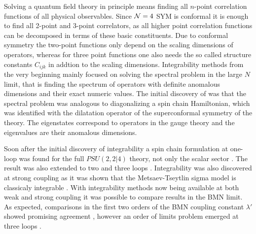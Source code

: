 Solving a quantum field theory in principle means finding all $n$-point correlation functions of all physical observables. 
Since $\mathcal{N}=4$ SYM is conformal it is enough to find all 2-point and 3-point correlators, as all higher point correlation functions can be decomposed in terms of these basic constituents.
Due to conformal symmetry the two-point functions only depend on the scaling dimensions of operators, whereas for three point functions one also needs the so called structure constants $C_{ijk}$ in addtion to the scaling dimensions.
Integrability methods from the very beginning mainly focused on solving the spectral problem in the large $N$ limit, that is finding the spectrum of operators with definite anomalous dimensions and their exact numeric values.
The initial discovery of \cite{Minahan:2002ve} was that the spectral problem was analogous to diagonalizing a spin chain Hamiltonian, which was identified with the dilatation operator of the superconformal symmetry of the theory.
The eigenstates correspond to operators in the gauge theory and the eigenvalues are their anomalous dimensions.

Soon after the initial discovery of integrability a spin chain formulation at one-loop was found for the full $PSU(2,2|4)$ theory, not only the scalar sector \cite{Beisert:2003jj}. 
The result was also extended to two and three loops \cite{Beisert:2003tq}. 
Integrability was also discovered at strong coupling as it was shown that the Metsaev-Tseytlin sigma model is classicaly integrable \cite{Bena:2003wd}. 
With integrability methods now being available at both weak and strong coupling it was possible to compare results in the BMN limit.
As expected, comparisons in the first two orders of the BMN coupling constant $\lambda'$ showed promising agreement \cite{Frolov:2003qc, Frolov:2003xy, Arutyunov:2003uj}, however an order of limits problem emerged at three loops \cite{Beisert:2003tq}. 

